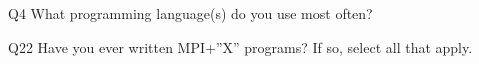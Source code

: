\begin{description}%
\item{Q4} What programming language(s) do you use most often?%
\item{Q22} Have you ever written MPI+”X” programs? If so, select all that apply.%
\end{description}%
